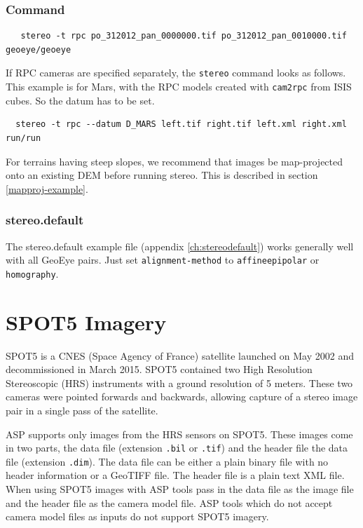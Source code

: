 \subsubsection*{Command}

\begin{verbatim}
   stereo -t rpc po_312012_pan_0000000.tif po_312012_pan_0010000.tif geoeye/geoeye
\end{verbatim}

If RPC cameras are specified separately, the \texttt{stereo} command
looks as follows. This example is for Mars, with the RPC models created
with \texttt{cam2rpc} from ISIS cubes.  So the datum has to be set.

\begin{verbatim}
  stereo -t rpc --datum D_MARS left.tif right.tif left.xml right.xml run/run
\end{verbatim}

For terrains having steep slopes, we recommend that images be map-projected
onto an existing DEM before running stereo. This is described in section
\ref{mapproj-example}.

\subsubsection*{stereo.default}

The stereo.default example file (appendix \ref{ch:stereodefault})
works generally well with all GeoEye pairs. Just set
\texttt{alignment-method} to \texttt{affineepipolar} or
\texttt{homography}.


\section{SPOT5 Imagery}
\label{sec:spot5}

SPOT5 is a CNES (Space Agency of France) satellite launched on May 2002 and 
decommissioned in March 2015.  SPOT5 contained two High Resolution Stereoscopic 
(HRS) instruments with a ground resolution of 5 meters.  These two cameras were
pointed forwards and backwards, allowing capture of a stereo image pair in
a single pass of the satellite.

ASP supports only images from the HRS sensors on SPOT5.  These images come in
two parts, the data file (extension \texttt{.bil} or \texttt{.tif}) and the header file
the data file (extension \texttt{.dim}).  The data file can be either a plain 
binary file with no header information or a GeoTIFF file.  The header file is a 
plain text XML file.  When using SPOT5 images with ASP tools pass in the data file
as the image file and the header file as the camera model file.  ASP tools
which do not accept camera model files as inputs do not support SPOT5 imagery.

